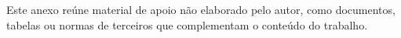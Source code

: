 \label{an:exemplo-de-anexo}


Este anexo reúne material de apoio não elaborado pelo autor, como documentos, tabelas ou normas de terceiros que complementam o conteúdo do trabalho.